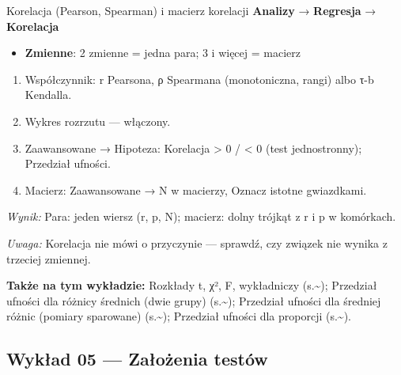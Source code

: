 \documentclass[
  polish,
  10pt,
  a4paper,
  DIV=11,
  numbers=noendperiod]{scrartcl}
\newcommand{\jmenu}[1]{{\color{upwraccent}\small #1}}
\begin{document}
\begin{jbox}{Korelacja (Pearson, Spearman) i macierz korelacji}\label{w:korelacja}
\jmenu{\textbf{Analizy} → \textbf{Regresja} → \textbf{Korelacja}}

\begin{itemize}
\item[$\triangleright$] \textbf{Zmienne}: 2 zmienne = jedna para; 3 i więcej = macierz
\end{itemize}
\begin{enumerate}
\item Współczynnik: r Pearsona, ρ Spearmana (monotoniczna, rangi) albo τ-b Kendalla.
\item Wykres rozrzutu — włączony.
\item Zaawansowane → Hipoteza: Korelacja \textgreater{} 0 / \textless{} 0 (test jednostronny); Przedział ufności.
\item Macierz: Zaawansowane → N w macierzy, Oznacz istotne gwiazdkami.
\end{enumerate}
\textit{Wynik:} Para: jeden wiersz (r, p, N); macierz: dolny trójkąt z r i p w komórkach.

{\color{upwrsoft}\small\textit{Uwaga:} Korelacja nie mówi o przyczynie — sprawdź, czy związek nie wynika z trzeciej zmiennej.}
\end{jbox}

\textbf{Także na tym wykładzie:} Rozkłady t, χ², F, wykładniczy
(s.\textasciitilde{}\pageref{w:rozklady-ciagle}); Przedział ufności dla
różnicy średnich (dwie grupy)
(s.\textasciitilde{}\pageref{w:ci-roznica-srednich}); Przedział ufności
dla średniej różnic (pomiary sparowane)
(s.\textasciitilde{}\pageref{w:ci-srednia-roznic}); Przedział ufności
dla proporcji (s.\textasciitilde{}\pageref{w:ci-proporcja}).


\subsection{Wykład 05 --- Założenia
testów}\label{wykux142ad-05-zaux142oux17cenia-testuxf3w}
\end{document}
